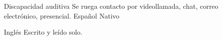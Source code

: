 
\begin{cvskills}
\cvskill
  {Discapacidad auditiva} %
  {Se ruega contacto por videollamada, chat, correo electrónico, presencial.} %
  \cvskill
    {Español} %
    {Nativo} %

  \cvskill
    {Inglés} %
    {Escrito y leído solo.} %
    
\end{cvskills}
